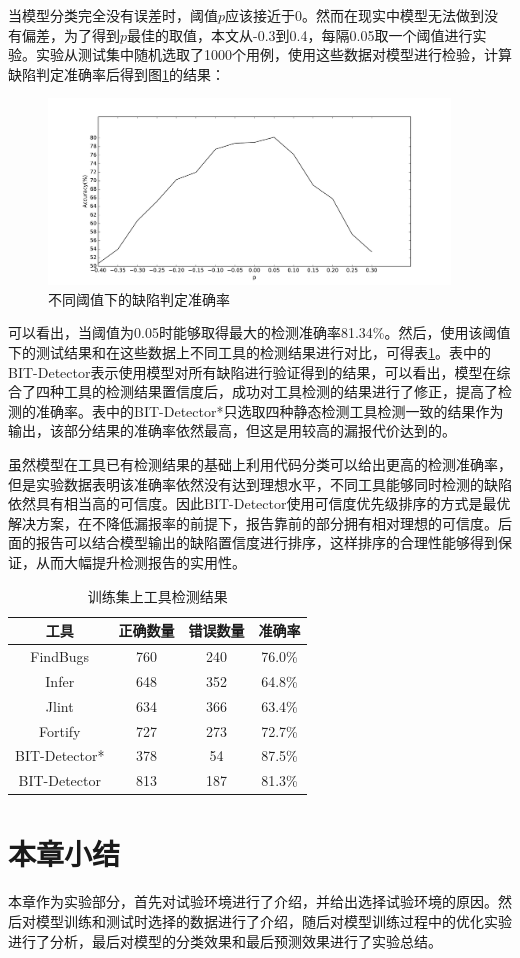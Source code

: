 当模型分类完全没有误差时，阈值$p$应该接近于0。然而在现实中模型无法做到没有偏差，为了得到$p$最佳的取值，本文从-0.3到0.4，每隔0.05取一个阈值进行实验。实验从测试集中随机选取了1000个用例，使用这些数据对模型进行检验，计算缺陷判定准确率后得到图\ref{res}的结果：
\begin{figure}[ht]
	\begin{center}
		\includegraphics[width=0.95\textwidth]{figures//10.pdf}
		\caption{不同阈值下的缺陷判定准确率}
		\label{res}
	\end{center}
\end{figure}

可以看出，当阈值为0.05时能够取得最大的检测准确率81.34\%。然后，使用该阈值下的测试结果和在这些数据上不同工具的检测结果进行对比，可得表\ref{tt}。表中的BIT-Detector表示使用模型对所有缺陷进行验证得到的结果，可以看出，模型在综合了四种工具的检测结果置信度后，成功对工具检测的结果进行了修正，提高了检测的准确率。表中的BIT-Detector*只选取四种静态检测工具检测一致的结果作为输出，该部分结果的准确率依然最高，但这是用较高的漏报代价达到的。

虽然模型在工具已有检测结果的基础上利用代码分类可以给出更高的检测准确率，但是实验数据表明该准确率依然没有达到理想水平，不同工具能够同时检测的缺陷依然具有相当高的可信度。因此BIT-Detector使用可信度优先级排序的方式是最优解决方案，在不降低漏报率的前提下，报告靠前的部分拥有相对理想的可信度。后面的报告可以结合模型输出的缺陷置信度进行排序，这样排序的合理性能够得到保证，从而大幅提升检测报告的实用性。

\begin{table}[t]
	\centering
	\caption{训练集上工具检测结果}
	\label{tt}
	\begin{tabular*}{0.9\textwidth}{@{\extracolsep{\fill}}cccc}
		\toprule
		工具	&正确数量&错误数量&准确率	 \\
		\midrule
		FindBugs&760&240&76.0\%\\
		Infer&648&352&64.8\%\\
		Jlint&634&366&63.4\%\\
		Fortify&727&273&72.7\%\\
		BIT-Detector*&378&54&87.5\%\\
		BIT-Detector&813&187&81.3\%\\
		\bottomrule
	\end{tabular*}
\end{table}

\section{本章小结}

本章作为实验部分，首先对试验环境进行了介绍，并给出选择试验环境的原因。然后对模型训练和测试时选择的数据进行了介绍，随后对模型训练过程中的优化实验进行了分析，最后对模型的分类效果和最后预测效果进行了实验总结。